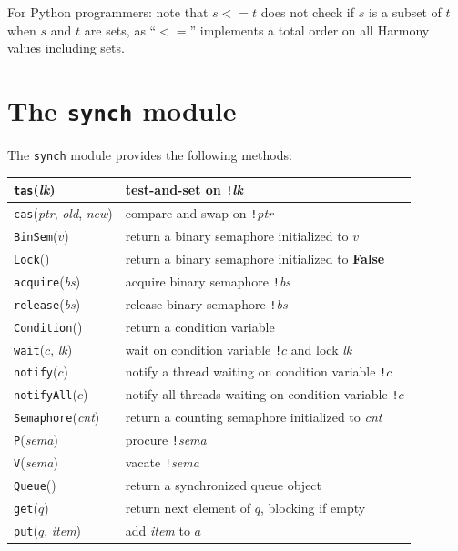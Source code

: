 \documentclass{report}
\begin{document}
\vspace{1em}
For Python programmers: note that $s <= t$ does not check if $s$ is a subset of
$t$ when $s$ and $t$ are sets, as ``$<=$'' implements a total order on all Harmony values
including sets.

\section{The \texttt{synch} module}

%
The \texttt{synch} module provides the following methods:

\vspace{1em}
\begin{tabular}{|l|l|}
\hline
\texttt{tas}(\textit{lk}) & test-and-set on \texttt{!}\textit{lk} \\
\hline
\texttt{cas}(\textit{ptr}, \textit{old}, \textit{new}) & compare-and-swap on \texttt{!}\textit{ptr} \\
\hline
\texttt{BinSem}($v$) & return a binary semaphore initialized to $v$ \\
\hline
\texttt{Lock}() & return a binary semaphore initialized to \textbf{False} \\
\hline
\texttt{acquire}(\textit{bs}) & acquire binary semaphore \texttt{!}\textit{bs} \\
\hline
\texttt{release}(\textit{bs}) & release binary semaphore \texttt{!}\textit{bs} \\
\hline
\texttt{Condition}() & return a condition variable \\
\hline
\texttt{wait}($c$, \textit{lk}) & wait on condition variable \texttt{!}$c$
and lock \textit{lk} \\ \hline
\texttt{notify}($c$) & notify a thread waiting on condition variable \texttt{!}$c$ \\
\hline
\texttt{notifyAll}($c$) & notify all threads waiting on condition variable \texttt{!}$c$ \\
\hline
\texttt{Semaphore}(\textit{cnt}) & return a counting semaphore initialized to \textit{cnt} \\
\hline
\texttt{P}(\textit{sema}) & procure \texttt{!}\textit{sema}  \\
\hline
\texttt{V}(\textit{sema}) & vacate \texttt{!}\textit{sema}  \\
\hline
\texttt{Queue}() & return a synchronized queue object \\
\hline
\texttt{get}($q$) & return next element of $q$, blocking if empty \\
\hline
\texttt{put}($q$, \textit{item}) & add \textit{item} to $a$ \\
\hline
\end{tabular}
\end{document}
